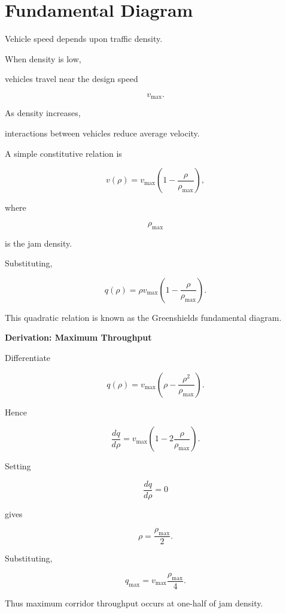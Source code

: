 \documentclass[11pt,fleqn]{book}
\numberwithin{equation}{chapter}
\newenvironment{derivation}[1]
  {\begin{derivationEnv}
   \noindent\textbf{Derivation: #1}\par\smallskip}
  {\end{derivationEnv}}
\theoremstyle{plain}
\theoremstyle{definition}
\theoremstyle{remark}
\begin{document}

\section{Fundamental Diagram}

Vehicle speed depends upon traffic density.

When density is low,

vehicles travel near the design speed

\[
v_{\max}.
\]

As density increases,

interactions between vehicles reduce average velocity.

A simple constitutive relation is

\[
\boxed{
v(\rho)
=
v_{\max}
\left(
1-
\frac{\rho}{\rho_{\max}}
\right),
}
\]

where

\[
\rho_{\max}
\]

is the jam density.

Substituting,

\[
q(\rho)
=
\rho
v_{\max}
\left(
1-
\frac{\rho}{\rho_{\max}}
\right).
\]

This quadratic relation is known as the Greenshields fundamental
diagram.


\begin{derivation}{Maximum Throughput}

Differentiate

\[
q(\rho)
=
v_{\max}
\left(
\rho
-
\frac{\rho^2}{\rho_{\max}}
\right).
\]

Hence

\[
\frac{dq}{d\rho}
=
v_{\max}
\left(
1-
2\frac{\rho}{\rho_{\max}}
\right).
\]

Setting

\[
\frac{dq}{d\rho}=0
\]

gives

\[
\rho
=
\frac{\rho_{\max}}2.
\]

Substituting,

\[
q_{\max}
=
v_{\max}
\frac{\rho_{\max}}4.
\]

Thus maximum corridor throughput occurs at one-half of jam density.

\end{derivation}

\end{document}
